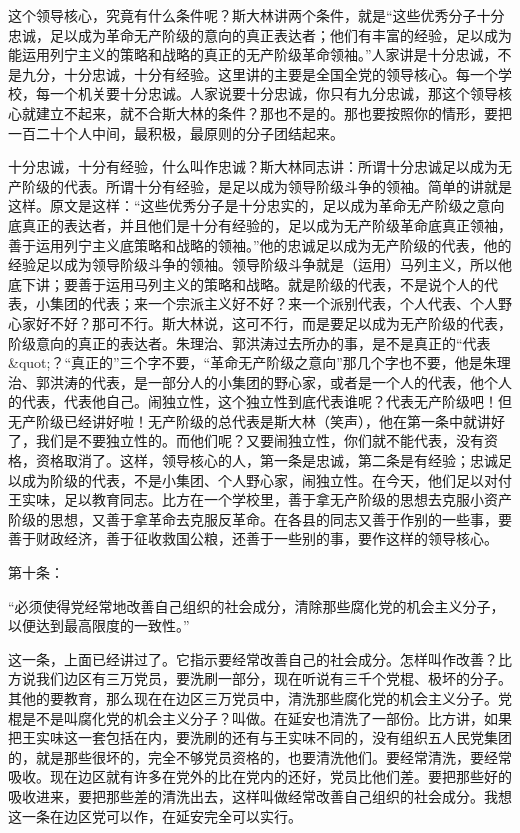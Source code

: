这个领导核心，究竟有什么条件呢？斯大林讲两个条件，就是“这些优秀分子十分忠诚，足以成为革命无产阶级的意向的真正表达者；他们有丰富的经验，足以成为能运用列宁主义的策略和战略的真正的无产阶级革命领袖。”人家讲是十分忠诚，不是九分，十分忠诚，十分有经验。这里讲的主要是全国全党的领导核心。每一个学校，每一个机关要十分忠诚。人家说要十分忠诚，你只有九分忠诚，那这个领导核心就建立不起来，就不合斯大林的条件？那也不是的。那也要按照你的情形，要把一百二十个人中间，最积极，最原则的分子团结起来。

十分忠诚，十分有经验，什么叫作忠诚？斯大林同志讲：所谓十分忠诚足以成为无产阶级的代表。所谓十分有经验，是足以成为领导阶级斗争的领袖。简单的讲就是这样。原文是这样：“这些优秀分子是十分忠实的，足以成为革命无产阶级之意向底真正的表达者，并且他们是十分有经验的，足以成为无产阶级革命底真正领袖，善于运用列宁主义底策略和战略的领袖。”他的忠诚足以成为无产阶级的代表，他的经验足以成为领导阶级斗争的领袖。领导阶级斗争就是（运用）马列主义，所以他底下讲；要善于运用马列主义的策略和战略。就是阶级的代表，不是说个人的代表，小集团的代表；来一个宗派主义好不好？来一个派别代表，个人代表、个人野心家好不好？那可不行。斯大林说，这可不行，而是要足以成为无产阶级的代表，阶级意向的真正的表达者。朱理治、郭洪涛过去所办的事，是不是真正的“代表&quot;？“真正的”三个字不要，“革命无产阶级之意向”那几个字也不要，他是朱理治、郭洪涛的代表，是一部分人的小集团的野心家，或者是一个人的代表，他个人的代表，代表他自己。闹独立性，这个独立性到底代表谁呢？代表无产阶级吧！但无产阶级已经讲好啦！无产阶级的总代表是斯大林（笑声），他在第一条中就讲好了，我们是不要独立性的。而他们呢？又要闹独立性，你们就不能代表，没有资格，资格取消了。这样，领导核心的人，第一条是忠诚，第二条是有经验；忠诚足以成为阶级的代表，不是小集团、个人野心家，闹独立性。在今天，他们足以对付王实味，足以教育同志。比方在一个学校里，善于拿无产阶级的思想去克服小资产阶级的思想，又善于拿革命去克服反革命。在各县的同志又善于作别的一些事，要善于财政经济，善于征收救国公粮，还善于一些别的事，要作这样的领导核心。

第十条：

“必须使得党经常地改善自己组织的社会成分，清除那些腐化党的机会主义分子，以便达到最高限度的一致性。”

这一条，上面已经讲过了。它指示要经常改善自己的社会成分。怎样叫作改善？比方说我们边区有三万党员，要洗刷一部分，现在听说有三千个党棍、极坏的分子。其他的要教育，那么现在在边区三万党员中，清洗那些腐化党的机会主义分子。党棍是不是叫腐化党的机会主义分子？叫做。在延安也清洗了一部份。比方讲，如果把王实味这一套包括在内，要洗刷的还有与王实味不同的，没有组织五人民党集团的，就是那些很坏的，完全不够党员资格的，也要清洗他们。要经常清洗，要经常吸收。现在边区就有许多在党外的比在党内的还好，党员比他们差。要把那些好的吸收进来，要把那些差的清洗出去，这样叫做经常改善自己组织的社会成分。我想这一条在边区党可以作，在延安完全可以实行。

